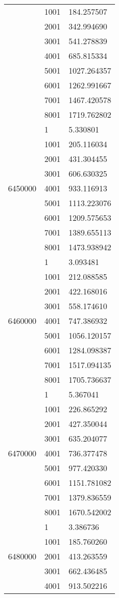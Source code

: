 \begin{table}[htb!]
\begin{tabular}{lll}
 & 1001 & 184.257507 \\
 & 2001 & 342.994690 \\
 & 3001 & 541.278839 \\
 & 4001 & 685.815334 \\
 & 5001 & 1027.264357 \\
 & 6001 & 1262.991667 \\
 & 7001 & 1467.420578 \\
 & 8001 & 1719.762802 \\
\multirow[c]{9}{*}{6450000} & 1 & 5.330801 \\
 & 1001 & 205.116034 \\
 & 2001 & 431.304455 \\
 & 3001 & 606.630325 \\
 & 4001 & 933.116913 \\
 & 5001 & 1113.223076 \\
 & 6001 & 1209.575653 \\
 & 7001 & 1389.655113 \\
 & 8001 & 1473.938942 \\
\multirow[c]{9}{*}{6460000} & 1 & 3.093481 \\
 & 1001 & 212.088585 \\
 & 2001 & 422.168016 \\
 & 3001 & 558.174610 \\
 & 4001 & 747.386932 \\
 & 5001 & 1056.120157 \\
 & 6001 & 1284.098387 \\
 & 7001 & 1517.094135 \\
 & 8001 & 1705.736637 \\
\multirow[c]{9}{*}{6470000} & 1 & 5.367041 \\
 & 1001 & 226.865292 \\
 & 2001 & 427.350044 \\
 & 3001 & 635.204077 \\
 & 4001 & 736.377478 \\
 & 5001 & 977.420330 \\
 & 6001 & 1151.781082 \\
 & 7001 & 1379.836559 \\
 & 8001 & 1670.542002 \\
\multirow[c]{9}{*}{6480000} & 1 & 3.386736 \\
 & 1001 & 185.760260 \\
 & 2001 & 413.263559 \\
 & 3001 & 662.436485 \\
 & 4001 & 913.502216 \\

\end{tabular}
\end{table}
